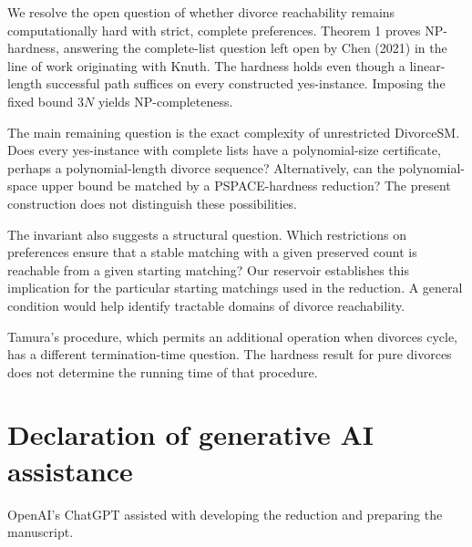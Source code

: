 \documentclass[11pt,letterpaper]{article}
\theoremstyle{definition}
\begin{document}
We resolve the open question of whether divorce reachability remains computationally hard with strict, complete preferences. Theorem 1 proves NP-hardness, answering the complete-list question left open by Chen (2021) in the line of work originating with Knuth. The hardness holds even though a linear-length successful path suffices on every constructed yes-instance. Imposing the fixed bound $3N$ yields NP-completeness.

The main remaining question is the exact complexity of unrestricted DivorceSM. Does every yes-instance with complete lists have a polynomial-size certificate, perhaps a polynomial-length divorce sequence? Alternatively, can the polynomial-space upper bound be matched by a PSPACE-hardness reduction? The present construction does not distinguish these possibilities.

The invariant also suggests a structural question. Which restrictions on preferences ensure that a stable matching with a given preserved count is reachable from a given starting matching? Our reservoir establishes this implication for the particular starting matchings used in the reduction. A general condition would help identify tractable domains of divorce reachability.

Tamura's procedure, which permits an additional operation when divorces cycle, has a different termination-time question. The hardness result for pure divorces does not determine the running time of that procedure.

\section*{Declaration of generative AI assistance}

OpenAI's ChatGPT assisted with developing the reduction and preparing the manuscript.
\end{document}
